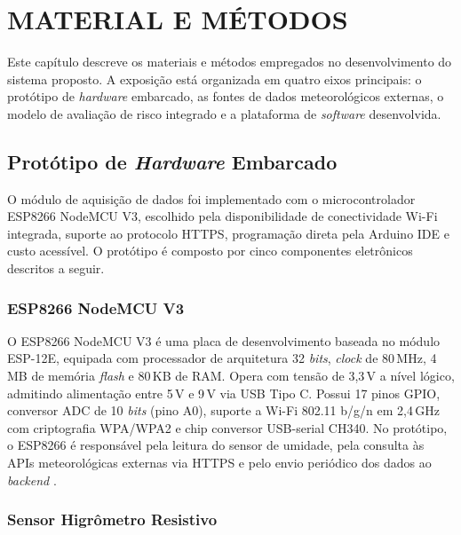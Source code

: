 \chapter{MATERIAL E MÉTODOS}
\label{cap:materiais-metodos}

Este capítulo descreve os materiais e métodos empregados no
desenvolvimento do sistema proposto. A exposição está organizada em
quatro eixos principais: o protótipo de \textit{hardware} embarcado,
as fontes de dados meteorológicos externas, o modelo de avaliação de
risco integrado e a plataforma de \textit{software} desenvolvida.

\section{Protótipo de \textit{Hardware} Embarcado}
\label{sec:hardware}

O módulo de aquisição de dados foi implementado com o microcontrolador
ESP8266 NodeMCU V3, escolhido pela disponibilidade de conectividade
Wi-Fi integrada, suporte ao protocolo HTTPS, programação direta pela
Arduino IDE e custo acessível. O protótipo é composto por cinco
componentes eletrônicos descritos a seguir.

\subsection{ESP8266 NodeMCU V3}
\label{subsec:esp8266}

O ESP8266 NodeMCU V3 é uma placa de desenvolvimento baseada no módulo
ESP-12E, equipada com processador de arquitetura 32 \textit{bits},
\textit{clock} de 80\,MHz, 4\,MB de memória \textit{flash} e 80\,KB
de RAM. Opera com tensão de 3,3\,V a nível lógico, admitindo
alimentação entre 5\,V e 9\,V via USB Tipo C. Possui 17 pinos GPIO,
conversor ADC de 10 \textit{bits} (pino A0), suporte a Wi-Fi 802.11
b/g/n em 2,4\,GHz com criptografia WPA/WPA2 e chip conversor USB-serial
CH340. No protótipo, o ESP8266 é responsável pela leitura do sensor
de umidade, pela consulta às APIs meteorológicas externas via HTTPS e
pelo envio periódico dos dados ao \textit{backend}
\cite{mercadolivre_esp8266}.

\subsection{Sensor Higrômetro Resistivo}
\label{subsec:higrometro}

